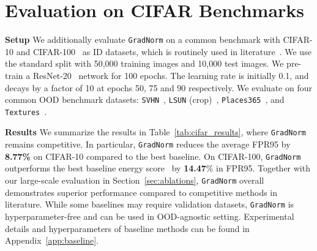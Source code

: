 \documentclass{article}
\begin{document}
\section{Evaluation on CIFAR Benchmarks}
\label{app:cifar}
\textbf{Setup}
We additionally evaluate \texttt{GradNorm} on a common benchmark with CIFAR-10 and CIFAR-100~\cite{krizhevsky2009learning} as ID datasets, which is routinely used in literature~\cite{hendrycks2016baseline,liang2018enhancing,hsu2020generalized,liu2020energy,lee2018simple}. We use the standard split with 50,000 training images and 10,000 test images. We pre-train a ResNet-20~\cite{he2016deep} network for 100 epochs. The learning rate is initially 0.1, and decays by a factor of 10 at epochs 50, 75 and 90 respectively. We evaluate on four common OOD benchmark datasets: \texttt{SVHN}~\cite{netzer2011reading}, \texttt{LSUN} (crop)~\cite{yu2015lsun}, \texttt{Places365}~\cite{zhou2017places}, and \texttt{Textures}~\cite{cimpoi14describing}. 

\textbf{Results} %
We summarize the results in Table~\ref{tab:cifar_results}, where \texttt{GradNorm} remains competitive. In particular, \texttt{GradNorm} reduces the average FPR95 by \textbf{8.77\%} on CIFAR-10 compared to the best baseline. On CIFAR-100, \texttt{GradNorm} outperforms the best baseline energy score~\cite{liu2020energy} by \textbf{14.47}\% in FPR95. Together with our large-scale evaluation in Section~\ref{sec:ablations}, \texttt{GradNorm} overall demonstrates superior performance compared to competitive methods in literature. While some baselines may require validation datasets, \texttt{GradNorm} is hyperparameter-free and can be used in OOD-agnostic setting. {Experimental details and hyperparameters of baseline methods can be found in Appendix~\ref{app:baseline}}. %
\end{document}
